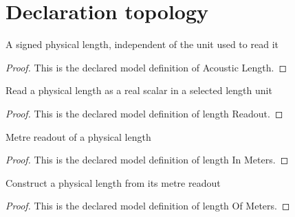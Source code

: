 \section{Declaration topology}
\begin{definition}
  \label{def:physics:phyx-mini-0322:phyxminiproblems-problemphyxmini0322-acousticlength}
  A signed physical length, independent of the unit used to read it
\end{definition}
\begin{proof}
  This is the declared model definition of Acoustic Length.
\end{proof}
\begin{definition}
  \label{def:physics:phyx-mini-0322:phyxminiproblems-problemphyxmini0322-lengthreadout}
  Read a physical length as a real scalar in a selected length unit
\end{definition}
\begin{proof}
  This is the declared model definition of length Readout.
\end{proof}
\begin{definition}
  \label{def:physics:phyx-mini-0322:phyxminiproblems-problemphyxmini0322-lengthinmeters}
  Metre readout of a physical length
\end{definition}
\begin{proof}
  This is the declared model definition of length In Meters.
\end{proof}
\begin{definition}
  \label{def:physics:phyx-mini-0322:phyxminiproblems-problemphyxmini0322-lengthofmeters}
  Construct a physical length from its metre readout
\end{definition}
\begin{proof}
  This is the declared model definition of length Of Meters.
\end{proof}
